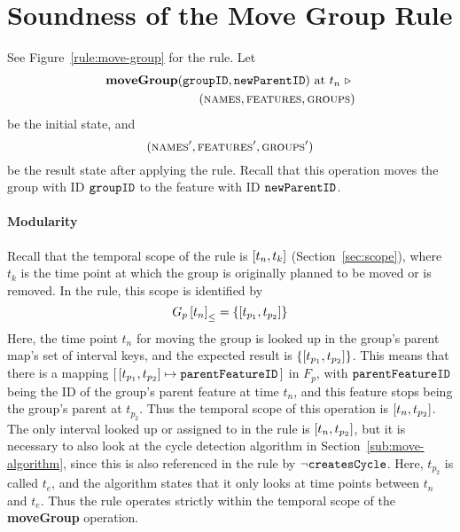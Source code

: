 
\section{Soundness of the Move Group Rule}
\label{sec:soundness-of-the-move-group-rule}

See Figure~\vref{rule:move-group} for the  rule. Let 
\begin{equation*}
   \begin{split}
      \textbf{moveGroup}(\texttt{groupID}, \texttt{newParentID}) \text{ at } t_n \ \triangleright \  \\
      (\textsc{names}, \textsc{features}, \textsc{groups}{})
   \end{split}
\end{equation*}
be the initial state, and
\[
   (\textsc{names}', \textsc{features}', \textsc{groups}{}')
\]
be the result state after applying the  rule. Recall that this operation moves the group with ID $\texttt{groupID}$ to the feature with ID $\texttt{newParentID}$.

\paragraph{Modularity}
Recall that the temporal scope of the  rule is $\interval{t_n}{t_k}$ (Section~\vref{sec:scope}), where $t_k$ is the time point at which the group is originally planned to be moved or is removed. In the rule, this scope is identified by 
   \[
      \containing{G_p}{t_n} = \set{\interval{t_{p_1}}{t_{p_2}}}
   \]
   Here, the time point $t_n$ for moving the group is looked up in the group's parent map's set of interval keys, and the expected result is $\set{\interval{t_{p_1}}{t_{p_2}}}$. This means that there is a mapping $\intervalmapping{t_{p_1}}{t_{p_2}}{\var{parentFeatureID}}$ in $F_p$, with $\texttt{parentFeatureID}$ being the ID of the group's parent feature at time $t_n$, and this feature stops being the group's parent at $t_{p_2}$. Thus the temporal scope of this operation is $\interval{t_n}{t_{p_2}}$. The only interval looked up or assigned to in the rule is $\interval{t_n}{t_{p_2}}$, but it is necessary to also look at the cycle detection algorithm in Section~\vref{sub:move-algorithm}, since this is also referenced in the rule by $\neg \texttt{createsCycle}$. Here, $t_{p_2}$ is called $t_e$, and the algorithm states that it only looks at time points between $t_n$ and $t_e$. Thus the rule operates strictly within the temporal scope of the \textbf{moveGroup} operation.

